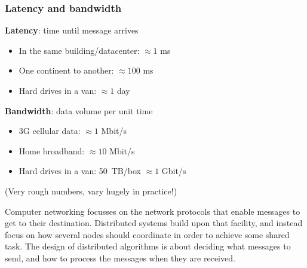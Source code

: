 \begin{frame}
    \label{s:latency-bandwidth}
    \frametitle{Latency and bandwidth}
    \textbf{Latency}: time until message arrives
    \begin{itemize}
        \item In the same building/datacenter: $\approx 1$ ms
        \item One continent to another: $\approx 100$ ms
        \item Hard drives in a van: $\approx 1$ day\\[2em]
    \end{itemize}\pause
    \textbf{Bandwidth}: data volume per unit time
    \begin{itemize}
        \item 3G cellular data: $\approx 1$ Mbit/s
        \item Home broadband: $\approx 10$ Mbit/s
        \item Hard drives in a van: 50~TB/box $\approx 1$ Gbit/s\\[1em]
    \end{itemize}
    (Very rough numbers, vary hugely in practice!)
\end{frame}

Computer networking focusses on the network protocols that enable messages to get to their destination.
Distributed systems build upon that facility, and instead focus on how several nodes should coordinate in order to achieve some shared task.
The design of distributed algorithms is about deciding what messages to send, and how to process the messages when they are received.

